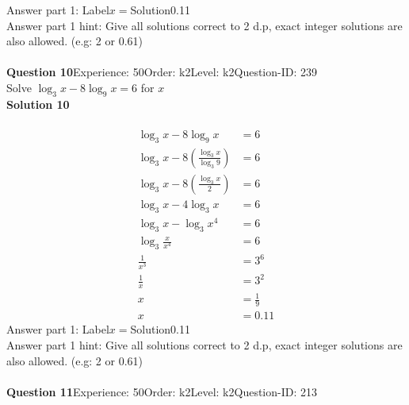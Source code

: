 \documentclass{article}
\begin{document}
Answer part 1: \hspace{10pt}Label\hspace{10pt}$x=$\hspace{10pt}Solution\hspace{10pt}0.11\\
Answer part 1 hint: \hspace{15pt}Give all solutions correct to 2 d.p, exact integer solutions are also allowed. (e.g: 2 or 0.61)\\
\\[4pt]
\noindent\textbf{Question 10}\hspace{20pt}Experience: 50\hspace{20pt}Order: k2\hspace{20pt}Level: k2\hspace{20pt}Question-ID: 239\\[2pt]
Solve $\log_{3}x-8\log_{9}x=6$ for $x$\\[4pt]
\noindent\textbf{Solution 10}\\[2pt]
\\[-35pt]\begin{align*}
\log_{3}x-8\log_{9}x&=6\\[2pt]
\log_{3}x-8\left(\displaystyle\frac{\log_{3}x}{\log_{3}9}\right)&=6\\[2pt]
\log_{3}x-8\left(\displaystyle\frac{\log_{3}x}{2}\right)&=6\\[2pt]
\log_{3}x-4\log_{3}x&=6\\[2pt]
\log_{3}x-\log_{3}x^4&=6\\[2pt]
\log_{3}\displaystyle\frac{x}{x^4}&=6\\[2pt]
\displaystyle\frac{1}{x^3}&=3^6\\[2pt]
\displaystyle\frac{1}{x}&=3^2\\[2pt]
x&=\displaystyle\frac{1}{9}\\[2pt]
x&=0.11
\end{align*}
Answer part 1: \hspace{10pt}Label\hspace{10pt}$x=$\hspace{10pt}Solution\hspace{10pt}0.11\\
Answer part 1 hint: \hspace{15pt}Give all solutions correct to 2 d.p, exact integer solutions are also allowed. (e.g: 2 or 0.61)\\
\\[4pt]
\noindent\textbf{Question 11}\hspace{20pt}Experience: 50\hspace{20pt}Order: k2\hspace{20pt}Level: k2\hspace{20pt}Question-ID: 213\\[2pt]
\end{document}
